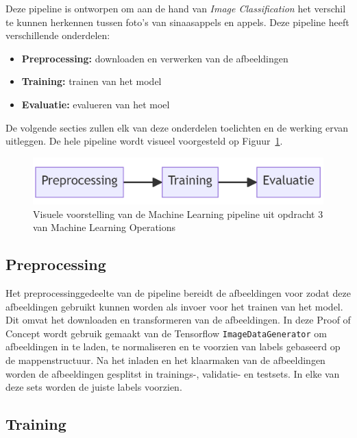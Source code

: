 Deze pipeline is ontworpen om aan de hand van \textit{Image Classification} het verschil te kunnen herkennen tussen foto's van sinaasappels en appels. Deze pipeline heeft verschillende onderdelen:

\begin{itemize}
    \item \textbf{Preprocessing:} downloaden en verwerken van de afbeeldingen
    \item \textbf{Training:} trainen van het model
    \item \textbf{Evaluatie:} evalueren van het moel
\end{itemize}

De volgende secties zullen elk van deze onderdelen toelichten en de werking ervan uitleggen. De hele pipeline wordt visueel voorgesteld op Figuur~\ref{fig:Model_Flow}.

\begin{figure}
    \centering
    \includegraphics[width=0.9\linewidth]{graphics/Model_Diagram.PNG}
    \caption[Visuele voorstelling pipeline PoC]{Visuele voorstelling van de Machine Learning pipeline uit opdracht 3 van Machine Learning Operations}
    \label{fig:Model_Flow}
\end{figure}


\subsection{Preprocessing}

Het preprocessinggedeelte van de pipeline bereidt de afbeeldingen voor zodat deze afbeeldingen gebruikt kunnen worden als invoer voor het trainen van het model. Dit omvat het downloaden en transformeren van de afbeeldingen. In deze Proof of Concept wordt gebruik gemaakt van de Tensorflow \texttt{ImageDataGenerator} om afbeeldingen in te laden, te normaliseren en te voorzien van labels gebaseerd op de mappenstructuur. Na het inladen en het klaarmaken van de afbeeldingen worden de afbeeldingen gesplitst in trainings-, validatie- en testsets. In elke van deze sets worden de juiste labels voorzien.

\subsection{Training}

